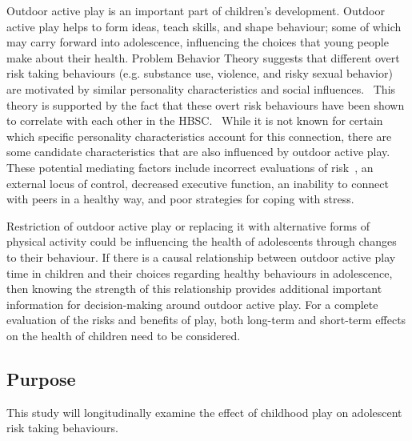 \documentclass [11pt]{article}
\begin{document}
Outdoor active play is an important part of children's development. Outdoor active play helps to form ideas, teach skills, and shape behaviour; some of which may carry forward into adolescence, influencing the choices that young people make about their health. Problem Behavior Theory \cite{Jessor1987-wz} suggests that different overt risk taking behaviours (e.g. substance use, violence, and risky sexual behavior) are motivated by similar personality characteristics and social influences.~\cite{Mobley2013-ij} This theory is supported by the fact that these overt risk behaviours have been shown to correlate with each other in the HBSC.~\cite{Kwong2017-oe} While it is not known for certain which specific personality characteristics account for this connection, there are some candidate characteristics that are also influenced by outdoor active play. These potential mediating factors include incorrect evaluations of risk~\cite{Couch2017-tb}, an external locus of control, decreased executive function, an inability to connect with peers in a healthy way, and poor strategies for coping with stress.~\cite{Unger2016-qm,Johnson2002-qf,barker2014less}

Restriction of outdoor active play or replacing it with alternative forms of physical activity could be influencing the health of adolescents through changes to their behaviour. If there is a causal relationship between outdoor active play time in children and their choices regarding healthy behaviours in adolescence, then knowing the strength of this relationship provides additional important information for decision-making around outdoor active play. For a complete evaluation of the risks and benefits of play, both long-term and short-term effects on the health of children need to be considered.

\subsection{Purpose}

This study will longitudinally examine the effect of childhood play on adolescent risk taking behaviours. 
\end{document}
